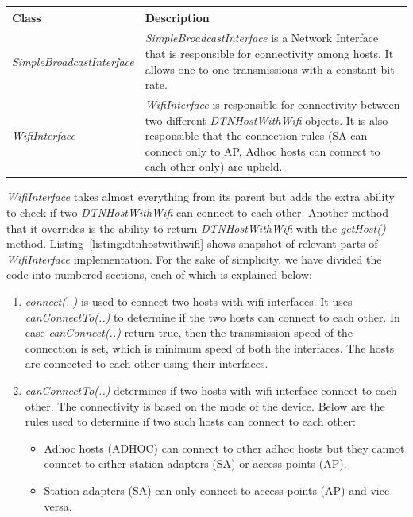 \begin{center}
	    \begin{tabular}{ | l | p{10cm} |}
    		\hline
    		\textbf{Class} & \textbf{Description} \\ \hline
    		\textit{SimpleBroadcastInterface} & \textit{SimpleBroadcastInterface} is a Network Interface that is responsible for connectivity among hosts. It allows one-to-one transmissions with a constant bit-rate.\\ \hline
    		\textit{WifiInterface} & \textit{WifiInterface} is responsible for connectivity between two different \textit{DTNHostWithWifi} objects. It is also responsible that the connection rules (SA can connect only to AP, Adhoc hosts can connect to each other only) are upheld. \\ \hline
    	\end{tabular}
	\end{center}
\vspace{3mm}
\textit{WifiInterface} takes almost everything from its parent but adds the extra ability to check if two \textit{DTNHostWithWifi} can connect to each other. Another method that it overrides is the ability to return \textit{DTNHostWithWifi} with the \textit{getHost()} method.\newline
\newline
Listing~\ref{listing:dtnhostwithwifi} shows snapshot of relevant parts of \textit{WifiInterface} implementation. For the sake of simplicity, we have divided the code into numbered sections, each of which is explained below:
\begin{enumerate}
	\item \textit{connect(..)} is used to connect two hosts with wifi interfaces. It uses \textit{canConnectTo(..)} to determine if the two hosts can connect to each other. In case \textit{canConnect(..)} return true, then the transmission speed of the connection is set, which is minimum speed of both the interfaces. The hosts are connected to each other using their interfaces.
	\item \textit{canConnectTo(..)} determines if two hosts with wifi interface connect to each other. The connectivity is based on the mode of the device. Below are the rules used to determine if two such hosts can connect to each other:
		\begin{itemize}
			\item Adhoc hosts (ADHOC) can connect to other adhoc hosts but they cannot connect to either station adapters (SA) or access points (AP).
			\item Station adapters (SA) can only connect to access points (AP) and vice versa.
		\end{itemize}
\end{enumerate}

